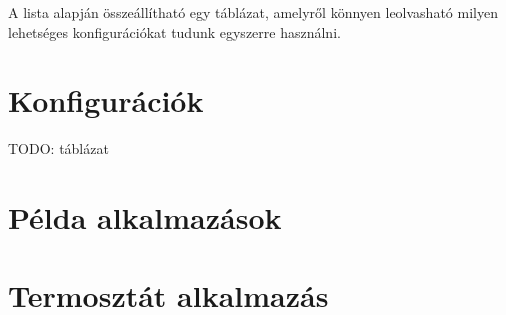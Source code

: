 A lista alapján összeállítható egy táblázat, amelyről könnyen leolvasható milyen lehetséges konfigurációkat tudunk egyszerre használni.

\section{Konfigurációk}

TODO: táblázat

\section{Példa alkalmazások}


\section{Termosztát alkalmazás}
